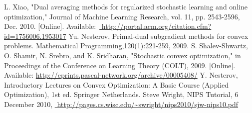 \documentclass[a4paper,11pt]{jsarticle}
\numberwithin{theorem}{section}  %
\numberwithin{equation}{section} %
\begin{document}
\begin{thebibliography}{99}
 L. Xiao, "Dual averaging methods for regularized stochastic learning and online optimization," Journal of Machine Learning Research, vol. 11, pp. 2543-2596, Dec. 2010. [Online]. Available:\,\,\,\url{ http://portal.acm.org/citation.cfm?id=1756006.1953017}
 Yu. Nesterov, Primal-dual subgradient methods for convex problems. Mathematical Programming,120(1):221-259, 2009.
 S. Shalev-Shwartz, O. Shamir, N. Srebro, and K. Sridharan, "Stochastic convex optimization," in Proceedings of the Conference on Learning Theory (COLT), 2009. [Online]. Available: \url{http://eprints.pascal-network.org/archive/00005408/}
 Y. Nesterov, Introductory Lectures on Convex Optimization: A Basic Course (Applied Optimization), 1st ed.    Springer Netherlands.
 Steve Wright, NIPS Tutorial, 6 December 2010,\,\,\url{ http://pages.cs.wisc.edu/~swright/nips2010/sjw-nips10.pdf}
\end{thebibliography}
\end{document}
